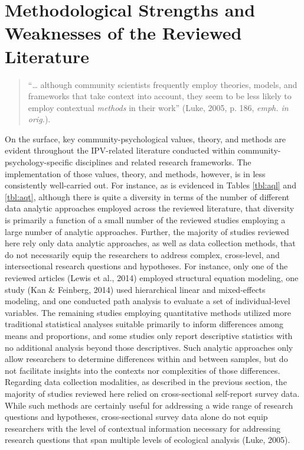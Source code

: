 \documentclass[11pt,]{tufte-book}
\begin{document}
\chapter{Methodological Strengths and Weaknesses of the Reviewed
Literature}\label{methodological-strengths-and-weaknesses-of-the-reviewed-literature}

\begin{quote}
``\ldots{} although community scientists frequently employ theories,
models, and frameworks that take context into account, they seem to be
less likely to employ contextual \emph{methods} in their work'' (Luke,
2005, p. 186, \emph{emph. in orig.}).
\end{quote}

On the surface, key community-psychological values, theory, and methods
are evident throughout the IPV-related literature conducted within
community-psychology-specific disciplines and related research
frameworks. The implementation of those values, theory, and methods,
however, is in less consistently well-carried out. For instance, as is
evidenced in Tables \ref{tbl:aql} and \ref{tbl:aqt}, although there is
quite a diversity in terms of the number of different data analytic
approaches employed across the reviewed literature, that diversity is
primarily a function of a small number of the reviewed studies employing
a large number of analytic approaches. Further, the majority of studies
reviewed here rely only data analytic approaches, as well as data
collection methods, that do not necessarily equip the researchers to
address complex, cross-level, and intersectional research questions and
hypotheses. For instance, only one of the reviewed articles (Lewis et
al., 2014) employed structural equation modeling, one study (Kan \&
Feinberg, 2014) used hierarchical linear and mixed-effects modeling, and
one conducted path analysis to evaluate a set of individual-level
variables. The remaining studies employing quantitative methods utilized
more traditional statistical analyses suitable primarily to inform
differences among means and proportions, and some studies only report
descriptive statistics with no additional analysis beyond those
descriptives. Such analytic approaches only allow researchers to
determine differences within and between samples, but do not facilitate
insights into the contexts nor complexities of those differences.
Regarding data collection modalities, as described in the previous
section, the majority of studies reviewed here relied on cross-sectional
self-report survey data. While such methods are certainly useful for
addressing a wide range of research questions and hypotheses,
cross-sectional survey data alone do not equip researchers with the
level of contextual information necessary for addressing research
questions that span multiple levels of ecological analysis (Luke, 2005).
\end{document}
